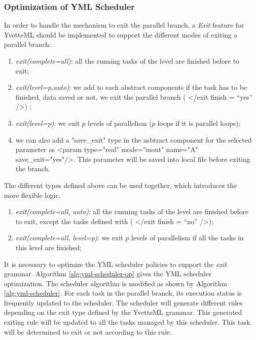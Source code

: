 \subsubsection{Optimization of YML Scheduler}

In order to handle the mechanism to exit the parallel branch, a \textit{Exit} feature for YvetteML should be implemented to support the different modes of exiting a parallel branch:

\begin{enumerate}[label=(\arabic*)]
	\item \textit{exit(complete=all)}: all the running tasks of the level are finished before to exit;
	\item \textit{exit(level=p,auto)}: we add to each abstract components if the task has to be finished, data saved or not, we exit the parallel branch ( </exit finish = “yes” />) ; 
	\item \textit{exit(level=p)}: we exit $p$ levels of parallelism ($p$ loops if it is parallel loops);
	\item  we can also add a "save\_exit" type in the asbtract component for the selected parameter as <param type="real" mode="inout" name="A" save\_exit="yes"/>. This parameter will be saved into local file before exiting the branch.
\end{enumerate}

The different types defined above can be used together, which introduces the more flexible logic. 

\begin{enumerate}[label=(\arabic*)]
	\item \textit{exit(complete=all, auto)}: all the running tasks of the level are finished before to exit, except the tasks defined with ( </exit finish = “no” />);
	\item \textit{exit(complete=all, level=p)}: we exit $p$ levels of parallelism if all the tasks in this level are finished;
\end{enumerate}

It is necessary to optimize the YML scheduler policies to support the \textit{exit} grammar. Algorithm \ref{alg:yml-scheduler-op} gives the YML scheduler optimization. The scheduler algorithm is modified as shown by Algorithm \ref{alg:yml-scheduler}. For each task in the parallel branch, its execution status is frequently updated to the scheduler. The scheduler will generate different rules depending on the exit type defined by the YvetteML grammar. This generated exiting rule will be updated to all the tasks managed by this scheduler. This task will be determined to exit or not according to this rule.

